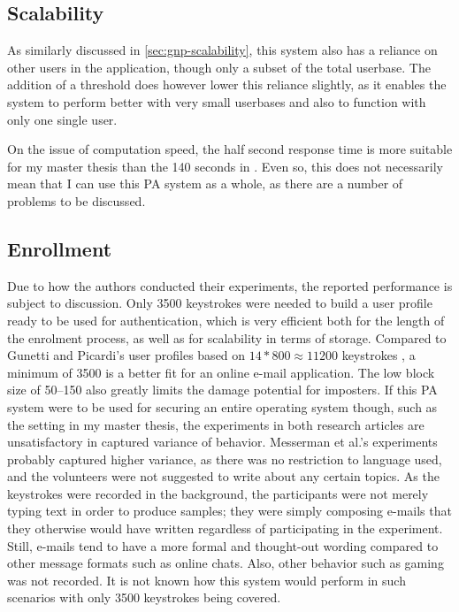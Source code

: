 \documentclass[informationsecurity]{gucmasterproject}
\begin{document}
\subsection{Scalability}
As similarly discussed in \autoref{sec:gnp-scalability}, this system also has a reliance on other users in the application, though only a subset of the total userbase.
The addition of a threshold does however lower this reliance slightly, as it enables the system to perform better with very small userbases and also to function with only one single user.

On the issue of computation speed, the half second response time is more suitable for my master thesis than the 140 seconds in \cite{gnp}.
Even so, this does not necessarily mean that I can use this PA system as a whole, as there are a number of problems to be discussed.

\subsection{Enrollment}
Due to how the authors conducted their experiments, the reported performance is subject to discussion.
Only 3500 keystrokes were needed to build a user profile ready to be used for authentication, which is very efficient both for the length of the enrolment process, as well as for scalability in terms of storage.
Compared to Gunetti and Picardi's user profiles based on $14*800\approx{11200}$ keystrokes \cite{gnp}, a minimum of 3500 is a better fit for an online e-mail application.
The low block size of 50--150 also greatly limits the damage potential for imposters.
If this PA system were to be used for securing an entire operating system though, such as the setting in my master thesis, the experiments in both research articles \cite{gnp, Messerman} are unsatisfactory in captured variance of behavior.
Messerman et al.'s \cite{Messerman} experiments probably captured higher variance, as there was no restriction to language used, and the volunteers were not suggested to write about any certain topics.
As the keystrokes were recorded in the background, the participants were not merely typing text in order to produce samples; they were simply composing e-mails that they otherwise would have written regardless of participating in the experiment.
Still, e-mails tend to have a more formal and thought-out wording compared to other message formats such as online chats.
Also, other behavior such as gaming was not recorded.
It is not known how this system would perform in such scenarios with only 3500 keystrokes being covered.
\end{document}
